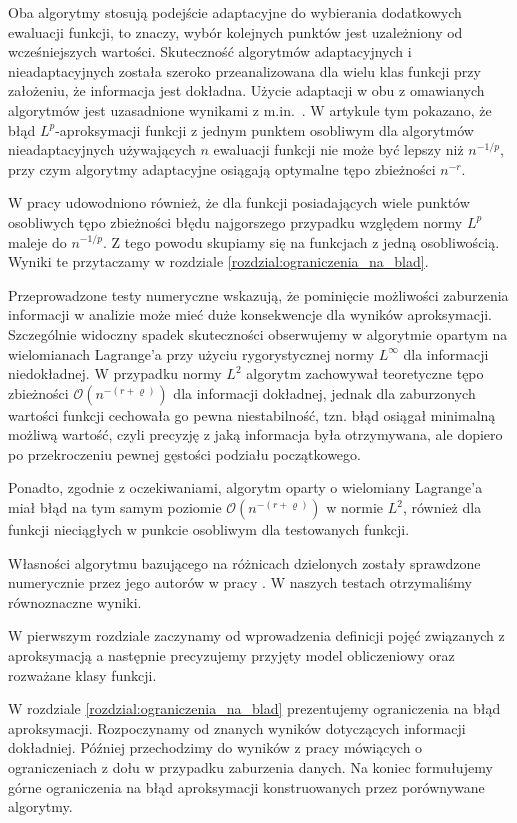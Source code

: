 \documentclass[oik, pdftex, man]{mgrwms}
\begin{document}
\begin{wstep}[Wprowadzenie]
    Oba algorytmy stosują podejście adaptacyjne do wybierania dodatkowych ewaluacji funkcji, to znaczy, wybór kolejnych punktów jest uzależniony od wcześniejszych wartości. Skuteczność algorytmów adaptacyjnych i nieadaptacyjnych została szeroko przeanalizowana dla wielu klas funkcji przy założeniu, że informacja jest dokładna. Użycie adaptacji w obu z omawianych algorytmów jest uzasadnione wynikami z m.in.~\cite{PoA}. W artykule tym pokazano, że błąd $L^{p}$-aproksymacji funkcji z jednym punktem osobliwym dla algorytmów nieadaptacyjnych używających $n$ ewaluacji funkcji nie może być lepszy niż $n^{-1/p}$, przy czym algorytmy adaptacyjne osiągają optymalne tępo zbieżności $n^{-r}$.

    W pracy \cite{PoA} udowodniono również, że dla funkcji posiadających wiele punktów osobliwych tępo zbieżności błędu najgorszego przypadku względem normy $L^{p}$ maleje do $n^{-1/p}$. Z tego powodu skupiamy się na funkcjach z jedną osobliwością. Wyniki te przytaczamy w rozdziale \ref{rozdzial:ograniczenia_na_blad}.

    Przeprowadzone testy numeryczne wskazują, że pominięcie możliwości zaburzenia informacji w analizie może mieć duże konsekwencje dla wyników aproksymacji. Szczególnie widoczny spadek skuteczności obserwujemy w algorytmie opartym na wielomianach Lagrange'a przy użyciu rygorystycznej normy $L^{\infty}$ dla informacji niedokładnej. W przypadku normy $L^{2}$ algorytm zachowywał teoretyczne tępo zbieżności $\mathcal{O}(n^{-(r+\varrho)})$ dla informacji dokładnej, jednak dla zaburzonych wartości funkcji cechowała go pewna niestabilność, tzn. błąd osiągał minimalną możliwą wartość, czyli precyzję z jaką informacja była otrzymywana, ale dopiero po przekroczeniu pewnej gęstości podziału początkowego. 
    
    Ponadto, zgodnie z oczekiwaniami, algorytm oparty o wielomiany Lagrange'a miał błąd na tym samym poziomie $\mathcal{O}(n^{-(r+\varrho)})$ w normie $L^{2}$, również dla funkcji nieciągłych w punkcie osobliwym dla testowanych funkcji.

    Własności algorytmu bazującego na różnicach dzielonych zostały sprawdzone numerycznie przez jego autorów w pracy \cite{AoP}. W naszych testach otrzymaliśmy równoznaczne wyniki.

    W pierwszym rozdziale zaczynamy od wprowadzenia definicji pojęć związanych z aproksymacją a następnie precyzujemy przyjęty model obliczeniowy oraz rozważane klasy funkcji.

    W rozdziale \ref{rozdzial:ograniczenia_na_blad} prezentujemy ograniczenia na błąd aproksymacji. Rozpoczynamy od znanych wyników dotyczących informacji dokładniej. Później przechodzimy do wyników z pracy \cite{AoP} mówiących o ograniczeniach z dołu w przypadku zaburzenia danych. Na koniec formułujemy górne ograniczenia na błąd aproksymacji konstruowanych przez porównywane algorytmy.


\end{wstep}
\end{document}
